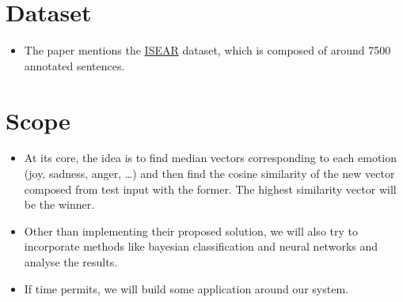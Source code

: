 \section{Dataset}
\label{sec-dataset}
\begin{itemize}
\item The paper mentions the \href{https://github.com/bogdanneacsa/tts-master/blob/master/ISEAR/DATA.csv}{ISEAR} dataset, which is composed of around 7500 annotated sentences.
\end{itemize}
\section{Scope}
\begin{itemize}
\item At its core, the idea is to find median vectors corresponding to each emotion (joy, sadness, anger, \ldots) and then find the cosine similarity of the new vector composed from test input with the former. The highest similarity vector will be the winner.
\item Other than implementing their proposed solution, we will also try to incorporate methods like bayesian classification and neural networks and analyse the results.
\item If time permits, we will build some application around our system.
\end{itemize}
